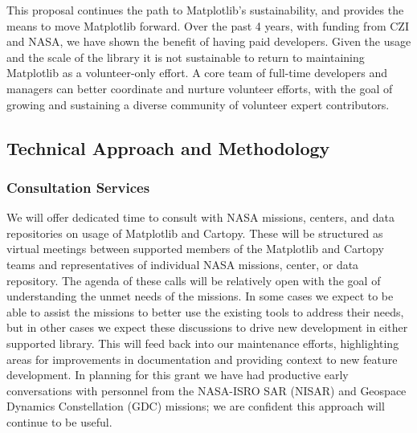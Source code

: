 \documentclass[12pt]{article}
\numberwithin{page}{section}
\begin{document}
This proposal continues the path to Matplotlib's sustainability, and provides the means to
move Matplotlib forward.  Over the past 4 years, with funding from CZI and NASA, we have
shown the benefit of having paid developers.
Given the usage and the scale of
the library it is not sustainable to return to maintaining Matplotlib as a
volunteer-only effort.  A core team of full-time developers and managers can
better coordinate and nurture volunteer efforts, with the goal of growing and
sustaining a diverse community of volunteer expert contributors.


\subsection{Technical Approach and Methodology}


\subsubsection{Consultation Services}

We will offer dedicated time to consult with NASA missions, centers, and data
repositories on usage of Matplotlib and Cartopy.  These will be structured as
virtual meetings between supported members of the Matplotlib and Cartopy teams
and representatives of individual NASA missions, center, or data repository.
The agenda of these calls will be relatively open with the goal of
understanding the unmet needs of the missions.  In some cases we expect to be
able to assist the missions to better use the existing tools to address their
needs, but in other cases we expect these discussions to drive new development
in either supported library.  This will feed back into our maintenance efforts,
highlighting areas for improvements in documentation and providing context to
new feature development.  In planning for this grant we have had productive early
conversations with personnel from the NASA-ISRO SAR (NISAR) and Geospace Dynamics Constellation
(GDC) missions; we are confident this approach will continue to be useful.
\end{document}

